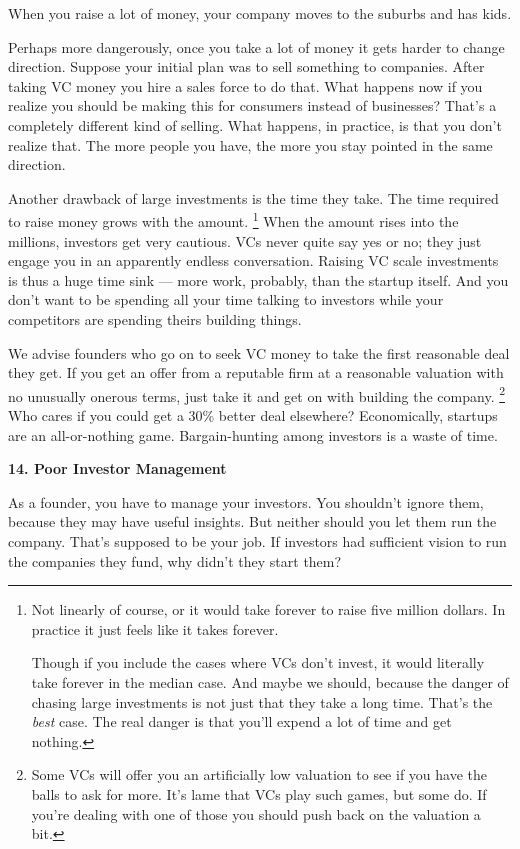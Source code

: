 When you raise a lot of money, your company moves to the suburbs and has
kids.

Perhaps more dangerously, once you take a lot of money it gets harder to
change direction. Suppose your initial plan was to sell something to
companies. After taking VC money you hire a sales force to do that. What
happens now if you realize you should be making this for consumers
instead of businesses? That's a completely different kind of selling.
What happens, in practice, is that you don't realize that. The more
people you have, the more you stay pointed in the same direction.

Another drawback of large investments is the time they take. The time
required to raise money grows with the amount. \footnote{Not linearly of course, or it would take forever to raise five
million dollars. In practice it just feels like it takes forever.

Though if you include the cases where VCs don't invest, it would
literally take forever in the median case. And maybe we should, because
the danger of chasing large investments is not just that they take a
long time. That's the \emph{best} case. The real danger is that you'll
expend a lot of time and get nothing.}
When the amount rises into the millions, investors get very cautious.
VCs never quite say yes or no; they just engage you in an apparently
endless conversation. Raising VC scale investments is thus a huge time
sink --- more work, probably, than the startup itself. And you don't
want to be spending all your time talking to investors while your
competitors are spending theirs building things.

We advise founders who go on to seek VC money to take the first
reasonable deal they get. If you get an offer from a reputable firm at a
reasonable valuation with no unusually onerous terms, just take it and
get on with building the company. \footnote{Some VCs will offer you an artificially low valuation to see if
you have the balls to ask for more. It's lame that VCs play such games,
but some do. If you're dealing with one of those you should push back on
the valuation a bit.} Who cares if
you could get a 30\% better deal elsewhere? Economically, startups are
an all-or-nothing game. Bargain-hunting among investors is a waste of
time.

\textbf{14. Poor Investor Management}

As a founder, you have to manage your investors. You shouldn't ignore
them, because they may have useful insights. But neither should you let
them run the company. That's supposed to be your job. If investors had
sufficient vision to run the companies they fund, why didn't they start
them?

